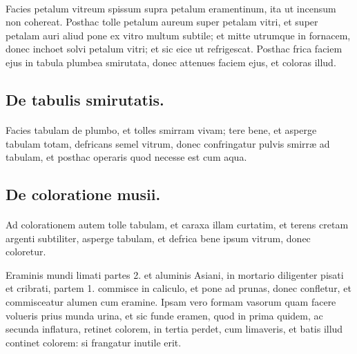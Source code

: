 \documentclass[a4paper, 11pt, oneside, polutonikogreek, italian]{article}
\begin{document}
\paragraph{}
Facies petalum vitreum spissum supra petalum eramentinum, ita ut incensum non cohereat. Posthac tolle petalum aureum super petalam vitri, et super petalam auri aliud pone ex vitro multum subtile; et mitte utrumque in fornacem, donec inchoet solvi petalum vitri; et sic eice ut refrigescat. Posthac frica faciem ejus in tabula plumbea smirutata, donec attenues faciem ejus, et coloras illud.

\subsection{De tabulis smirutatis.}
\paragraph{}
Facies tabulam de plumbo, et tolles smirram vivam; tere bene, et asperge tabulam totam, defricans semel vitrum, donec confringatur pulvis smirræ ad tabulam, et posthac operaris quod necesse est cum aqua.

\subsection{De coloratione musii.}
\paragraph{}
Ad colorationem autem tolle tabulam, et caraxa illam curtatim, et terens cretam argenti subtiliter, asperge tabulam, et defrica bene ipsum vitrum, donec coloretur.

Eraminis mundi limati partes 2. et aluminis Asiani, in mortario diligenter pisati et cribrati, partem 1. commisce in caliculo, et pone ad prunas, donec confletur, et commisceatur alumen cum eramine. Ipsam vero formam vasorum quam facere volueris prius munda urina, et sic funde eramen, quod in prima quidem, ac secunda inflatura, retinet colorem, in tertia perdet, cum limaveris, et batis illud continet colorem: si frangatur inutile erit.
\end{document}
